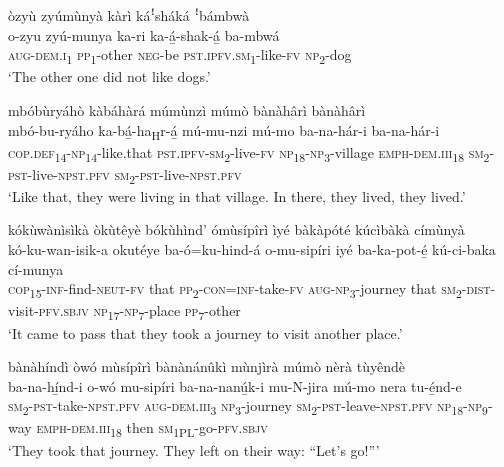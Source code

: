 òzyù zyúmùnyà kàrì káꜝsháká ꜝbámbwà\\
\gll o-zyu    zyú-munya  ka-ri    ka-á̲-shak-á̲      ba-mbwá\\
\textsc{aug}{}-\textsc{dem}.\textsc{i}\textsubscript{1}  \textsc{pp}\textsubscript{1}{}-other  \textsc{neg}{}-be  \textsc{pst}.\textsc{ipfv}.\textsc{sm}\textsubscript{1}{}-like-\textsc{fv}  \textsc{np}\textsubscript{2}{}-dog\\
\glt ‘The other one did not like dogs.’\bigskip

mbóbùryáhò kàbáhàrá múmùnzì múmò bànàhârì bànàhârì\\
\gll  mbó-bu-ryáho    ka-bá̲-ha\textsubscript{H}r-á̲      mú-mu-nzi mú-mo    ba-na-hár-i      ba-na-hár-i\\
\textsc{cop}.\textsc{def}\textsubscript{14}{}-\textsc{np}\textsubscript{14}{}-like.that  \textsc{pst}.\textsc{ipfv}{}-\textsc{sm}\textsubscript{2}{}-live-\textsc{fv}  \textsc{np}\textsubscript{18}{}-\textsc{np}\textsubscript{3}{}-village
\textsc{emph}{}-\textsc{dem}.\textsc{iii}\textsubscript{18}  \textsc{sm}\textsubscript{2}{}-\textsc{pst}{}-live-\textsc{npst}.\textsc{pfv}  \textsc{sm}\textsubscript{2}{}-\textsc{pst}{}-live-\textsc{npst}.\textsc{pfv}\\
\glt ‘Like that, they were living in that village. In there, they lived, they lived.’\bigskip

kókùwànìsìkà òkùtêyè bókùhìnd’ ómùsípîrì ìyé bàkàpóté kúcìbàkà címùnyà\\
\gll kó-ku-wan-isik-a    okutéye  ba-ó=ku-hind-á  o-mu-sipíri    iyé  ba-ka-pot-é̲      kú-ci-baka    cí-munya\\
\textsc{cop}\textsubscript{15}{}-\textsc{inf}{}-find-\textsc{neut}{}-\textsc{fv}  that    \textsc{pp}\textsubscript{2}{}-\textsc{con}=\textsc{inf}{}-take-\textsc{fv}
\textsc{aug}{}-\textsc{np}\textsubscript{3}{}-journey   that  \textsc{sm}\textsubscript{2}{}-\textsc{dist}{}-visit-\textsc{pfv}.\textsc{sbjv}  \textsc{np}\textsubscript{17}{}-\textsc{np}\textsubscript{7}{}-place  \textsc{pp}\textsubscript{7}{}-other\\
\glt ‘It came to pass that they took a journey to visit another place.’\bigskip

bànàhíndì òwó mùsípîrì bànànánûkì mùnjìrà múmò nèrà tùyêndè\\
\gll ba-na-hí̲nd-i      o-wó    mu-sipíri ba-na-nanú̲k-i     mu-N-jira    mú-mo    nera  tu-é̲nd-e\\
\textsc{sm}\textsubscript{2}{}-\textsc{pst}{}-take-\textsc{npst}.\textsc{pfv}  \textsc{aug}{}-\textsc{dem}.\textsc{iii}\textsubscript{3}  \textsc{np}\textsubscript{3}{}-journey
\textsc{sm}\textsubscript{2}{}-\textsc{pst}{}-leave-\textsc{npst}.\textsc{pfv}  \textsc{np}\textsubscript{18}{}-\textsc{np}\textsubscript{9}{}-way  \textsc{emph}{}-\textsc{dem}.\textsc{iii}\textsubscript{18}  then  \textsc{sm}\textsubscript{1PL}{}-go-\textsc{pfv}.\textsc{sbjv}\\
\glt ‘They took that journey. They left on their way: “Let’s go!”’\bigskip

